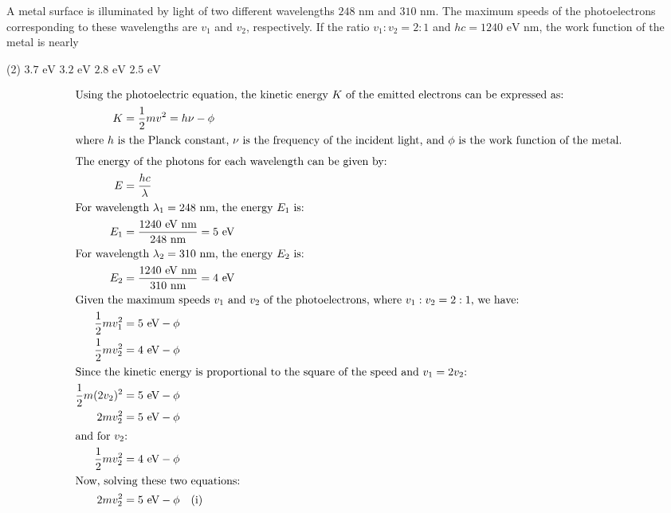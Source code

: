 
\item A metal surface is illuminated by light of two different wavelengths \(248 \text{ nm}\) and \(310 \text{ nm}\). The maximum speeds of the photoelectrons corresponding to these wavelengths are \(v_1\) and \(v_2\), respectively. If the ratio \(v_1:v_2 = 2:1\) and \(hc = 1240 \text{ eV nm}\), the work function of the metal is nearly
    \begin{tasks}(2)
        \task \(3.7 \text{ eV}\)
        \task \(3.2 \text{ eV}\)
        \task \(2.8 \text{ eV}\)
        \task \(2.5 \text{ eV}\)
    \end{tasks}

    \begin{solution}
        \begin{align*}
            \intertext{Using the photoelectric equation, the kinetic energy \( K \) of the emitted electrons can be expressed as:}
            K &= \frac{1}{2}mv^2 = h\nu - \phi\\
            \intertext{where \( h \) is the Planck constant, \( \nu \) is the frequency of the incident light, and \( \phi \) is the work function of the metal.}
            \intertext{The energy of the photons for each wavelength can be given by:}
            E &= \frac{hc}{\lambda}\\
            \intertext{For wavelength \( \lambda_1 = 248 \text{ nm} \), the energy \( E_1 \) is:} 
            E_1 &= \frac{1240 \text{ eV nm}}{248 \text{ nm}} = 5 \text{ eV}\\
            \intertext{For wavelength \( \lambda_2 = 310 \text{ nm} \), the energy \( E_2 \) is:} 
            E_2 &= \frac{1240 \text{ eV nm}}{310 \text{ nm}} = 4 \text{ eV}\\
            \intertext{Given the maximum speeds \( v_1 \) and \( v_2 \) of the photoelectrons, where \( v_1:v_2 = 2:1 \), we have:} 
            \frac{1}{2}mv_1^2 &= 5 \text{ eV} - \phi\\
            \frac{1}{2}mv_2^2 &= 4 \text{ eV} - \phi\\
            \intertext{Since the kinetic energy is proportional to the square of the speed and \( v_1 = 2v_2 \):} 
            \frac{1}{2}m(2v_2)^2 &= 5 \text{ eV} - \phi\\
            2mv_2^2 &= 5 \text{ eV} - \phi\\
            \intertext{and for \( v_2 \):}
            \frac{1}{2}mv_2^2 &= 4 \text{ eV} - \phi\\
            \intertext{Now, solving these two equations:} 
            2mv_2^2 &= 5 \text{ eV} - \phi \quad \text{(i)}\\

\end{align*}
\end{solution}
